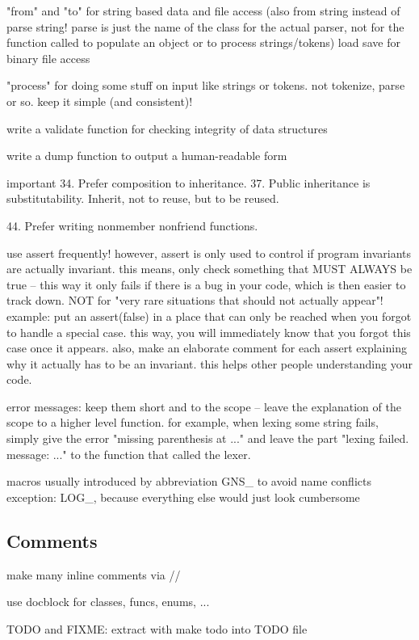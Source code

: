 \documentclass[a4paper,10pt]{article}
\begin{document}
"from" and "to" for string based data and file access (also from string instead of parse string! parse is just the name of the class for the actual parser, not for the function called to populate an object or to process strings/tokens)
load save for binary file access

"process" for doing some stuff on input like strings or tokens. not tokenize, parse or so. keep it simple (and consistent)!

write a validate function for checking integrity of data structures

write a dump function to output a human-readable form

important
34. Prefer composition to inheritance.
37. Public inheritance is substitutability. Inherit, not to reuse, but to be reused.

44. Prefer writing nonmember nonfriend functions.

use assert frequently!
however, assert is only used to control if program invariants are actually invariant. this means, only check something that MUST ALWAYS be true -- this way it only fails if there is a bug in your code, which is then easier to track down. NOT for "very rare situations that should not actually appear"!
example: put an assert(false) in a place that can only be reached when you forgot to handle a special case. this way, you will immediately know that you forgot this case once it appears.
also, make an elaborate comment for each assert explaining why it actually has to be an invariant. this helps other people understanding your code.

error messages: keep them short and to the scope -- leave the explanation of the scope to a higher level function.
for example, when lexing some string fails, simply give the error "missing parenthesis at ..." and leave the part "lexing failed. message: ..." to the function that called the lexer.

macros
usually introduced by abbreviation GNS\_ to avoid name conflicts
exception: LOG\_, because everything else would just look cumbersome

\subsection{Comments}
\label{sec:CodingConventions:sub:Comments}

make many inline comments via //

use docblock for classes, funcs, enums, ...

TODO and FIXME: extract with make todo into TODO file
\end{document}
